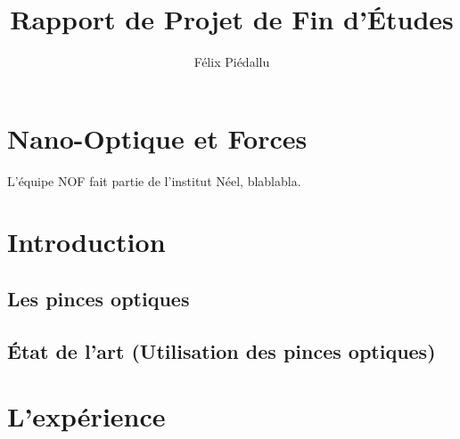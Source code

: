 \documentclass[a4paper,12pt]{report}
\date{}
\title{Rapport de Projet de Fin d'Études}
\author{Félix Piédallu}
\begin{document}
\nocite{*}


%

\chapter*{Nano-Optique et Forces}
L'équipe NOF fait partie de l'institut Néel, blablabla.

%
%
%
%





\chapter*{Introduction} %
    \section{Les pinces optiques}

    \section{État de l'art (Utilisation des pinces optiques)}
%

\chapter{L'expérience}

\end{document}
